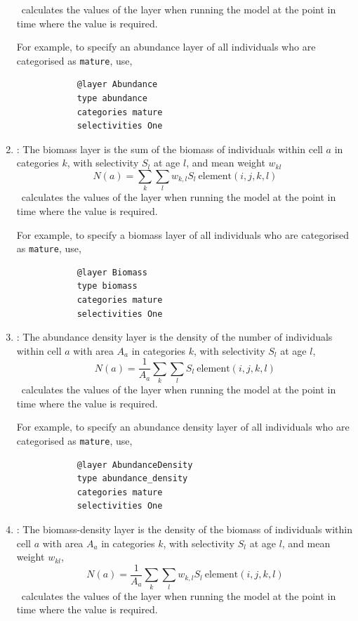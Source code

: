 \begin{enumerate}
	
	\IBM\ calculates the values of the layer when running the model at the point in time where the value is required.
	
	For example, to specify an abundance layer of all individuals who are categorised as \texttt{mature}, use,
	{\small{\begin{verbatim}
			@layer Abundance
			type abundance
			categories mature
			selectivities One
			\end{verbatim}}}
	
	\item {}: The biomass layer is the sum of the biomass of individuals within cell $a$ in categories $k$, with selectivity $S_l$ at age $l$, and mean weight $w_{kl}$
	\begin{equation}
	N(a) = \sum\limits_{k} \sum\limits_l w_{k,l} S_l \ \text{element}(i,j,k,l) 
	\end{equation}
	\IBM\ calculates the values of the layer when running the model at the point in time where the value is required.
	
	For example, to specify a biomass layer of all individuals who are categorised as \texttt{mature}, use,
	{\small{\begin{verbatim}
			@layer Biomass
			type biomass
			categories mature
			selectivities One
			\end{verbatim}}}
	
	\item {}: The abundance density layer is the density of the number of individuals within cell $a$ with area $A_a$ in categories $k$, with selectivity $S_l$ at age $l$,
	\begin{equation}
	N(a) = \frac{1}{A_a} \sum\limits_{k} \sum\limits_l S_l \ \text{element}(i,j,k,l)
	\end{equation}
	\IBM\ calculates the values of the layer when running the model at the point in time where the value is required.
	
	For example, to specify an abundance density layer of all individuals who are categorised as \texttt{mature}, use,
	{\small{\begin{verbatim}
			@layer AbundanceDensity
			type abundance_density
			categories mature
			selectivities One
			\end{verbatim}}}
	
	\item {}: The biomass-density layer is the density of the biomass of individuals within cell $a$ with area $A_a$ in categories $k$, with selectivity $S_l$ at age $l$, and mean weight $w_{kl}$,
	\begin{equation}
	N(a) = \frac{1}{A_a} \sum\limits_{k} \sum\limits_l w_{k,l} S_l \ \text{element}(i,j,k,l)
	\end{equation}
	\IBM\ calculates the values of the layer when running the model at the point in time where the value is required.
	

\end{enumerate}
